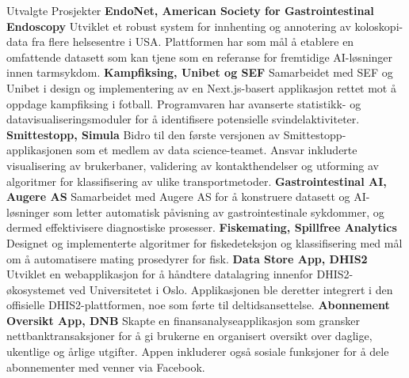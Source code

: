 \begin{rubric}{Utvalgte Prosjekter}
%
\entry*[2023]%
\textbf{EndoNet, American Society for Gastrointestinal Endoscopy} Utviklet et robust system for innhenting og annotering av koloskopi-data fra flere helsesentre i USA. Plattformen har som mål å etablere en omfattende datasett som kan tjene som en referanse for fremtidige AI-løsninger innen tarmsykdom.
%
\entry*[2022]%
\textbf{Kampfiksing, Unibet og SEF} Samarbeidet med SEF og Unibet i design og implementering av en Next.js-basert applikasjon rettet mot å oppdage kampfiksing i fotball. Programvaren har avanserte statistikk- og datavisualiseringsmoduler for å identifisere potensielle svindelaktiviteter.
%
\entry*[2020]%
\textbf{Smittestopp, Simula} Bidro til den første versjonen av Smittestopp-applikasjonen som et medlem av data science-teamet. Ansvar inkluderte visualisering av brukerbaner, validering av kontakthendelser og utforming av algoritmer for klassifisering av ulike transportmetoder.
%
\entry*[2019]%
\textbf{Gastrointestinal AI, Augere AS} Samarbeidet med Augere AS for å konstruere datasett og AI-løsninger som letter automatisk påvisning av gastrointestinale sykdommer, og dermed effektivisere diagnostiske prosesser.
%
\entry*[2018]%
\textbf{Fiskemating, Spillfree Analytics} Designet og implementerte algoritmer for fiskedeteksjon og klassifisering med mål om å automatisere mating prosedyrer for fisk.
%
\entry*[2017]%
\textbf{Data Store App, DHIS2} Utviklet en webapplikasjon for å håndtere datalagring innenfor DHIS2-økosystemet ved Universitetet i Oslo. Applikasjonen ble deretter integrert i den offisielle DHIS2-plattformen, noe som førte til deltidsansettelse.
%
\entry*[2017]%
\textbf{Abonnement Oversikt App, DNB} Skapte en finansanalyseapplikasjon som gransker nettbanktransaksjoner for å gi brukerne en organisert oversikt over daglige, ukentlige og årlige utgifter. Appen inkluderer også sosiale funksjoner for å dele abonnementer med venner via Facebook.
%
\end{rubric}